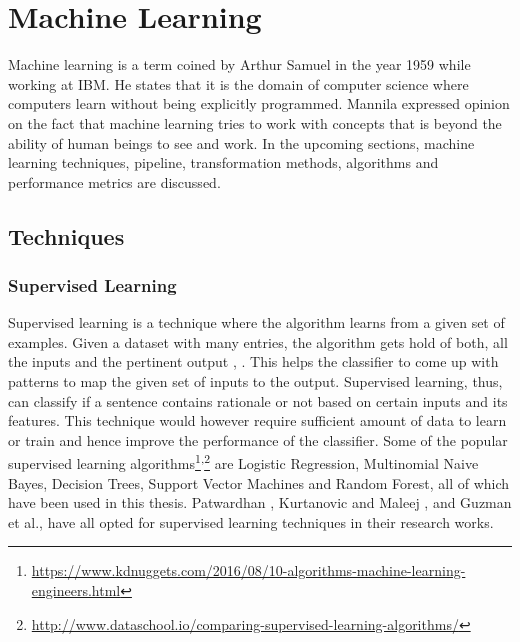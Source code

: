 \documentclass[a4paper,12pt,twoside]{report}
\begin{document}
\section{Machine Learning}
Machine learning is a term coined by Arthur Samuel in the year 1959 \cite{Samuel1959a} while working at IBM. He states that it is the domain of computer science where computers learn without being explicitly programmed. Mannila \cite{Mannila1996a} expressed opinion on the fact that machine learning tries to work with concepts that is beyond the ability of human beings to see and work. In the upcoming sections, machine learning techniques, pipeline, transformation methods, algorithms and performance metrics are discussed. 

\subsection{Techniques}

\subsubsection{Supervised Learning}
Supervised learning is a technique where the algorithm learns from a given set of examples. Given a dataset with many entries, the algorithm gets hold of both, all the inputs and the pertinent output \cite{Singh2016}, \cite{Caruana2006}. This helps the classifier to come up with patterns to map the given set of inputs to the output. Supervised learning, thus, can classify if a sentence contains rationale or not based on certain inputs and its features. This technique would however require sufficient amount of data to learn or train and hence improve the performance of the classifier. Some of the popular supervised learning algorithms\footnote{\url{https://www.kdnuggets.com/2016/08/10-algorithms-machine-learning-engineers.html}}\textsuperscript{,}\footnote{\url{http://www.dataschool.io/comparing-supervised-learning-algorithms/}} are Logistic Regression, Multinomial Naive Bayes, Decision Trees, Support Vector Machines and Random Forest, all of which have been used in this thesis. Patwardhan \cite{Patwardhan2017}, Kurtanovic and Maleej \cite{Kurtanovic2017}, and Guzman et al.\cite{Guzman2016}, have all opted for supervised learning techniques in their research works.
\end{document}
